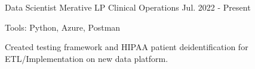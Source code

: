 

\begin{cventries}

  \cvexpentry
    {Data Scientist} %
    {Merative LP}
    {Clinical Operations} %
    {Jul. 2022 - Present}
    {
      \begin{cvheavyparagraph}
        Tools: Python, Azure, Postman
      \end{cvheavyparagraph}
    }
    {
      \begin{cvcompactparagraph}
        Created testing framework and HIPAA patient deidentification for ETL/Implementation on new data platform.
      \end{cvcompactparagraph}
    }


\end{cventries}
